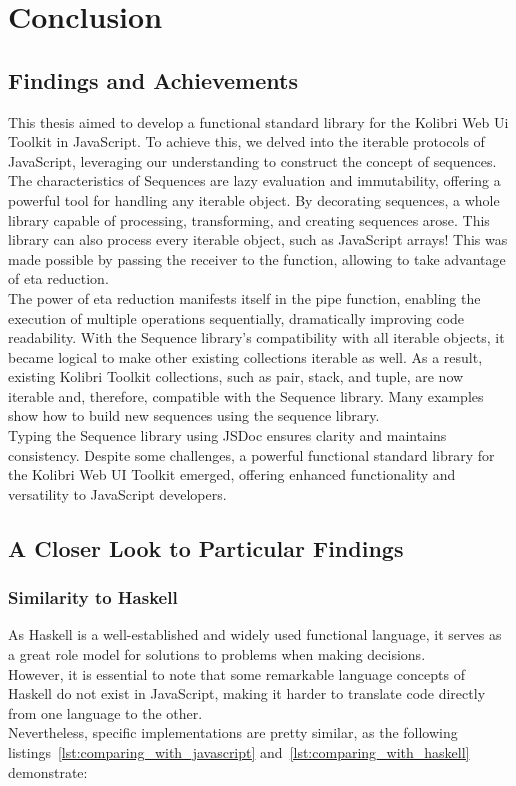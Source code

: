 \section{Conclusion}
\label{sec:conclusion}
\subsection{Findings and Achievements}
\label{sub:Findings and Achievements}
This thesis aimed to develop a functional standard library for the Kolibri Web
Ui Toolkit in JavaScript. To achieve this, we delved into the iterable
protocols of JavaScript, leveraging our understanding to construct the concept
of sequences. The characteristics of Sequences are lazy evaluation and
immutability, offering a powerful tool for handling any iterable object. By
decorating sequences, a whole library capable of processing, transforming, and
creating sequences arose. This library can also process every iterable object,
such as JavaScript arrays! This was made possible by passing the receiver to
the function, allowing to take advantage of eta reduction.\\
The power of eta reduction manifests itself in the pipe function, enabling the
execution of multiple operations sequentially, dramatically improving code
readability. With the Sequence library’s compatibility with all iterable
objects, it became logical to make other existing collections iterable as well.
As a result, existing Kolibri Toolkit collections, such as pair, stack, and
tuple, are now iterable and, therefore, compatible with the Sequence library.
Many examples show how to build new sequences using the sequence library.\\
Typing the Sequence library using JSDoc ensures clarity and maintains
consistency. Despite some challenges, a powerful functional
standard library for the Kolibri Web UI Toolkit emerged, offering enhanced
functionality and versatility to JavaScript developers.
\subsection{A Closer Look to Particular Findings}
\label{sub:A Closer Look to Particular Findings}

\subsubsection{Similarity to Haskell}
\label{subsub:Similarity to Haskell}
As Haskell is a well-established and widely used functional language, it serves
as a great role model for solutions to problems when making decisions. \\
However, it is essential to note that some remarkable language concepts of
Haskell do not exist in JavaScript, making it harder to translate code directly
from one language to the other. \\
Nevertheless, specific implementations are
pretty similar, as the following listings~\ref{lst:comparing_with_javascript}
and~\ref{lst:comparing_with_haskell} demonstrate:

